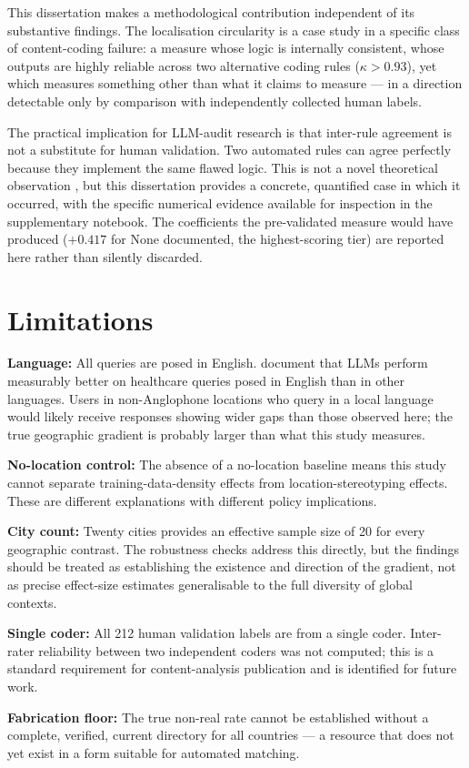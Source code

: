This dissertation makes a methodological contribution independent of its substantive findings. The localisation circularity is a case study in a specific class of content-coding failure: a measure whose logic is internally consistent, whose outputs are highly reliable across two alternative coding rules ($\kappa > 0.93$), yet which measures something other than what it claims to measure --- in a direction detectable only by comparison with independently collected human labels.

The practical implication for LLM-audit research is that inter-rule agreement is not a substitute for human validation. Two automated rules can agree perfectly because they implement the same flawed logic. This is not a novel theoretical observation \citep{depaoli2024thematic}, but this dissertation provides a concrete, quantified case in which it occurred, with the specific numerical evidence available for inspection in the supplementary notebook. The coefficients the pre-validated measure would have produced ($+0.417$ for None documented, the highest-scoring tier) are reported here rather than silently discarded.

\section{Limitations}

\textbf{Language:} All queries are posed in English. \citet{jin2024english} document that LLMs perform measurably better on healthcare queries posed in English than in other languages. Users in non-Anglophone locations who query in a local language would likely receive responses showing wider gaps than those observed here; the true geographic gradient is probably larger than what this study measures.

\textbf{No-location control:} The absence of a no-location baseline means this study cannot separate training-data-density effects from location-stereotyping effects. These are different explanations with different policy implications.

\textbf{City count:} Twenty cities provides an effective sample size of 20 for every geographic contrast. The robustness checks address this directly, but the findings should be treated as establishing the existence and direction of the gradient, not as precise effect-size estimates generalisable to the full diversity of global contexts.

\textbf{Single coder:} All 212 human validation labels are from a single coder. Inter-rater reliability between two independent coders was not computed; this is a standard requirement for content-analysis publication and is identified for future work.

\textbf{Fabrication floor:} The true non-real rate cannot be established without a complete, verified, current directory for all countries --- a resource that does not yet exist in a form suitable for automated matching.
